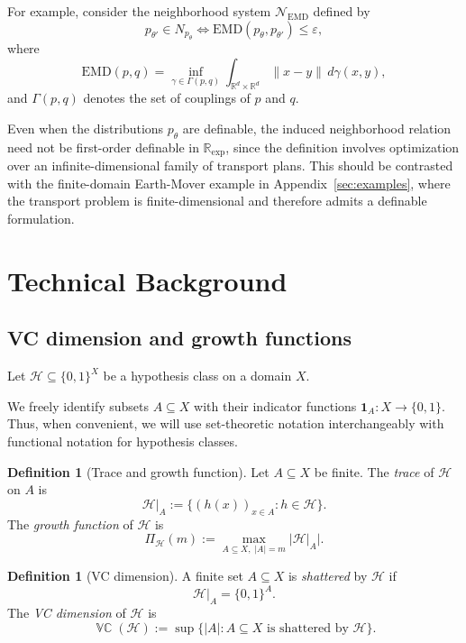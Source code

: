 \documentclass[11pt]{article}
\theoremstyle{plain}
\theoremstyle{definition}
\newtheorem{definition}[theorem]{Definition}
\theoremstyle{remark}
\DeclareMathOperator{\VCdim}{\mathbb{VC}}
\newcommand{\R}{\mathbb{R}}
\begin{document}
For example, consider the neighborhood system \(\mathcal N_{\mathrm{EMD}}\) defined by
\[
p_{\theta'}\in N_{p_\theta}
\Longleftrightarrow
\mathrm{EMD}(p_\theta,p_{\theta'}) \le \varepsilon,
\]
where
\[
\mathrm{EMD}(p,q)
=
\inf_{\gamma\in\Gamma(p,q)}
\int_{\R^d\times\R^d}
\|x-y\|\,d\gamma(x,y),
\]
and \(\Gamma(p,q)\) denotes the set of couplings of \(p\) and \(q\).

Even when the distributions \(p_\theta\) are definable, the induced
neighborhood relation need not be first-order definable in
\(\R_{\exp}\), since the definition involves optimization over an
infinite-dimensional family of transport plans. This should be contrasted
with the finite-domain Earth-Mover example in
Appendix~\ref{sec:examples}, where the transport problem is finite-dimensional and therefore admits a definable formulation.

\section{Technical Background}

\label{app:formal-definitions}





\subsection{VC dimension and growth functions}
\label{app:vc}

Let \(\mathcal H\subseteq \{0,1\}^X\) be a hypothesis class on a domain \(X\).

We freely identify subsets \(A\subseteq X\) with their indicator functions
\(\mathbf 1_A\colon X\to\{0,1\}\). Thus, when convenient, we will use
set-theoretic notation interchangeably with functional notation for hypothesis
classes.

\begin{definition}[Trace and growth function]
Let \(A\subseteq X\) be finite. The \emph{trace} of \(\mathcal H\) on \(A\) is
\[
  \mathcal H|_A
  :=
  \{
    (h(x))_{x\in A}
    :
    h\in\mathcal H
  \}.
\]
The \emph{growth function} of \(\mathcal H\) is
\[
  \Pi_{\mathcal H}(m)
  :=
  \max_{A\subseteq X,\;|A|=m}
  |\mathcal H|_A|.
\]
\end{definition}

\begin{definition}[VC dimension]
A finite set \(A\subseteq X\) is \emph{shattered} by \(\mathcal H\) if
\[
  \mathcal H|_A
  =
  \{0,1\}^A.
\]
The \emph{VC dimension} of \(\mathcal H\) is
\[
  \VCdim(\mathcal H)
  :=
  \sup
  \{
    |A|
    :
    A\subseteq X
    \text{ is shattered by }\mathcal H
  \}.
\]
\end{definition}
\end{document}
